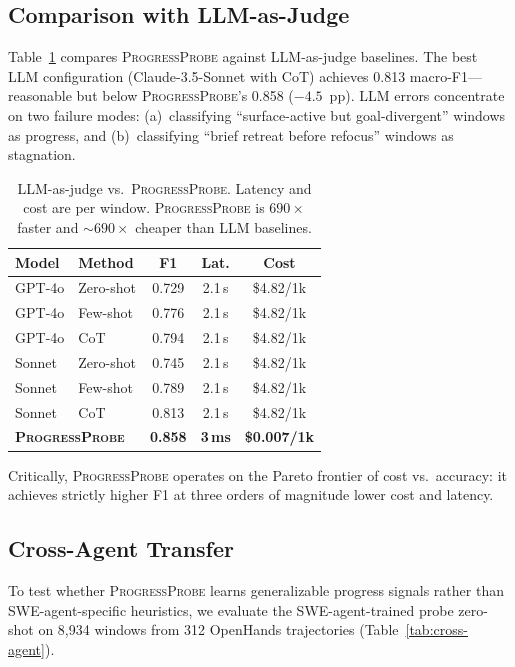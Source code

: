 \documentclass[11pt,a4paper]{article}
\newcommand{\ours}{\textsc{ProgressProbe}}
\begin{document}
\subsection{Comparison with LLM-as-Judge}
\label{sec:llm-judge}

Table~\ref{tab:llm-judge} compares \ours{} against LLM-as-judge baselines. The best LLM configuration (Claude-3.5-Sonnet with CoT) achieves 0.813 macro-F1---reasonable but below \ours{}'s 0.858 ($-4.5$~pp). LLM errors concentrate on two failure modes: (a)~classifying ``surface-active but goal-divergent'' windows as progress, and (b)~classifying ``brief retreat before refocus'' windows as stagnation.

\begin{table}[t]
\centering
\small
\begin{tabular}{llccc}
\toprule
\textbf{Model} & \textbf{Method} & \textbf{F1} & \textbf{Lat.} & \textbf{Cost} \\
\midrule
GPT-4o & Zero-shot & 0.729 & 2.1\,s & \$4.82/1k \\
GPT-4o & Few-shot & 0.776 & 2.1\,s & \$4.82/1k \\
GPT-4o & CoT & 0.794 & 2.1\,s & \$4.82/1k \\
Sonnet & Zero-shot & 0.745 & 2.1\,s & \$4.82/1k \\
Sonnet & Few-shot & 0.789 & 2.1\,s & \$4.82/1k \\
Sonnet & CoT & 0.813 & 2.1\,s & \$4.82/1k \\
\midrule
\multicolumn{2}{l}{\textbf{\ours{}}} & \textbf{0.858} & \textbf{3\,ms} & \textbf{\$0.007/1k} \\
\bottomrule
\end{tabular}
\caption{LLM-as-judge vs.\ \ours{}. Latency and cost are per window. \ours{} is $690\times$ faster and ${\sim}690\times$ cheaper than LLM baselines.}
\label{tab:llm-judge}
\end{table}

Critically, \ours{} operates on the Pareto frontier of cost vs.\ accuracy: it achieves strictly higher F1 at three orders of magnitude lower cost and latency.

\subsection{Cross-Agent Transfer}
\label{sec:cross-agent}

To test whether \ours{} learns generalizable progress signals rather than SWE-agent-specific heuristics, we evaluate the SWE-agent-trained probe zero-shot on 8{,}934 windows from 312 OpenHands trajectories (Table~\ref{tab:cross-agent}).
\end{document}
